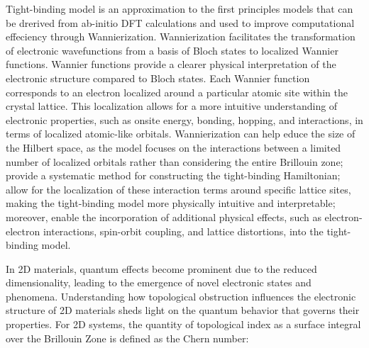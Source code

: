 Tight-binding model is an approximation to the first principles models that can be drerived from ab-initio DFT calculations and used to improve computational effeciency through Wannierization. Wannierization facilitates the transformation of electronic wavefunctions from a basis of Bloch states to localized Wannier functions. Wannier functions provide a clearer physical interpretation of the electronic structure compared to Bloch states. Each Wannier function corresponds to an electron localized around a particular atomic site within the crystal lattice. This localization allows for a more intuitive understanding of electronic properties, such as onsite energy, bonding, hopping, and interactions, in terms of localized atomic-like orbitals. Wannierization can help educe the size of the Hilbert space, as the model focuses on the interactions between a limited number of localized orbitals rather than considering the entire Brillouin zone; provide a systematic method for constructing the tight-binding Hamiltonian; allow for the localization of these interaction terms around specific lattice sites, making the tight-binding model more physically intuitive and interpretable; moreover, enable the incorporation of additional physical effects, such as electron-electron interactions, spin-orbit coupling, and lattice distortions, into the tight-binding model.

In 2D materials, quantum effects become prominent due to the reduced dimensionality, leading to the emergence of novel electronic states and phenomena. Understanding how topological obstruction influences the electronic structure of 2D materials sheds light on the quantum behavior that governs their properties. For 2D systems, the quantity of topological index as a surface integral over the Brillouin Zone is defined as the Chern number:

